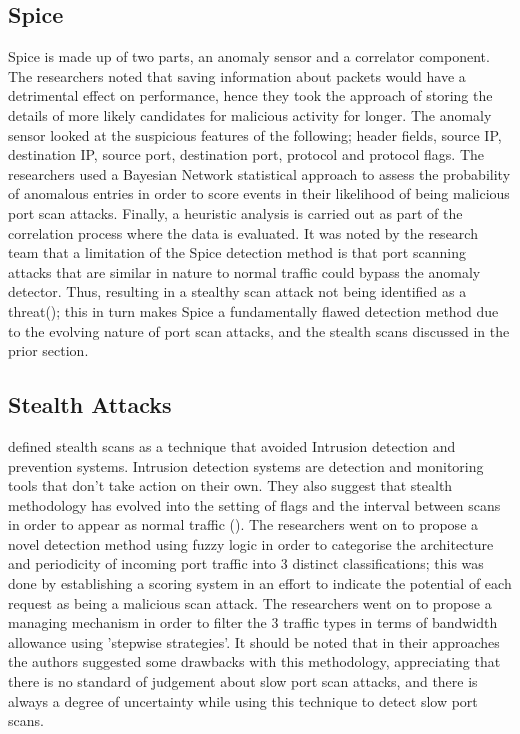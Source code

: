 \subsection{Spice}
 
Spice is made up of two parts, an anomaly sensor and a correlator component. The researchers noted that saving information about packets would have a detrimental effect on performance, hence they took the approach of storing the details of more likely candidates for malicious activity for longer. The anomaly sensor looked at the suspicious features of the following; header fields, source IP, destination IP, source port, destination port, protocol and protocol flags. The researchers used a Bayesian Network statistical approach to assess the probability of anomalous entries in order to score events in their likelihood of being malicious port scan attacks. Finally, a heuristic analysis is carried out as part of the correlation process where the data is evaluated. It was noted by the research team that a limitation of the Spice detection method is that port scanning attacks that are similar in nature to normal traffic could bypass the anomaly detector. Thus, resulting in a stealthy scan attack not being identified as a threat(\cite{staniford2002practical}); this in turn makes Spice a fundamentally flawed detection method due to the evolving nature of port scan attacks, and the stealth scans discussed in the prior section.


\subsection{Stealth Attacks}

\citeauthor{kim2008slow} defined stealth scans as a technique that avoided Intrusion detection and prevention systems. Intrusion detection systems are detection and monitoring tools that don't take action on their own. They also suggest that stealth methodology has evolved into the setting of flags and the interval between scans in order to appear as normal traffic (\cite{kim2008slow}). The researchers went on to propose a novel detection method using fuzzy logic in order to categorise the architecture and periodicity of incoming port traffic into 3 distinct classifications; this was done by establishing a scoring system in an effort to indicate the potential of each request as being a malicious scan attack. The researchers went on to propose a managing mechanism in order to filter the 3 traffic types in terms of bandwidth allowance using 'stepwise strategies'. It should be noted that in their approaches the authors suggested some drawbacks with this methodology, appreciating that there is no standard of judgement about slow port scan attacks, and there is always a degree of uncertainty while using this technique to detect slow port scans.

